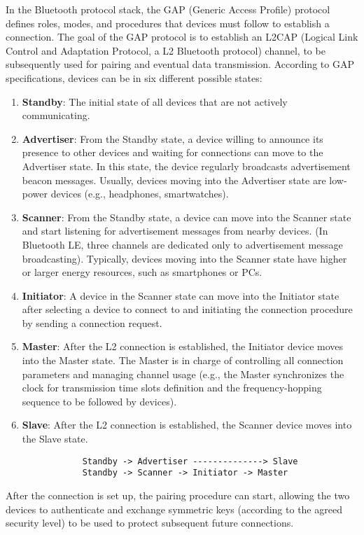 \begin{solution}
    In the Bluetooth protocol stack, the GAP (Generic Access Profile) protocol defines roles, modes, and procedures that devices must follow to establish a connection. The goal of the GAP protocol is to establish an L2CAP (Logical Link Control and Adaptation Protocol, a L2 Bluetooth protocol) channel, to be subsequently used for pairing and eventual data transmission. According to GAP specifications, devices can be in six different possible states:
    \begin{enumerate}
        \item \textbf{Standby}: The initial state of all devices that are not actively communicating.
        \item \textbf{Advertiser}: From the Standby state, a device willing to announce its presence to other devices and waiting for connections can move to the Advertiser state. In this state, the device regularly broadcasts advertisement beacon messages. Usually, devices moving into the Advertiser state are low-power devices (e.g., headphones, smartwatches).
        \item \textbf{Scanner}: From the Standby state, a device can move into the Scanner state and start listening for advertisement messages from nearby devices. (In Bluetooth LE, three channels are dedicated only to advertisement message broadcasting). Typically, devices moving into the Scanner state have higher or larger energy resources, such as smartphones or PCs.
        \item \textbf{Initiator}: A device in the Scanner state can move into the Initiator state after selecting a device to connect to and initiating the connection procedure by sending a connection request.
        \item \textbf{Master}: After the L2 connection is established, the Initiator device moves into the Master state. The Master is in charge of controlling all connection parameters and managing channel usage (e.g., the Master synchronizes the clock for transmission time slots definition and the frequency-hopping sequence to be followed by devices).
        \item \textbf{Slave}: After the L2 connection is established, the Scanner device moves into the Slave state.
        \begin{verbatim}
            Standby -> Advertiser --------------> Slave
            Standby -> Scanner -> Initiator -> Master
        \end{verbatim}

    \end{enumerate}

    After the connection is set up, the pairing procedure can start, allowing the two devices to authenticate and exchange symmetric keys (according to the agreed security level) to be used to protect subsequent future connections.


\end{solution}



